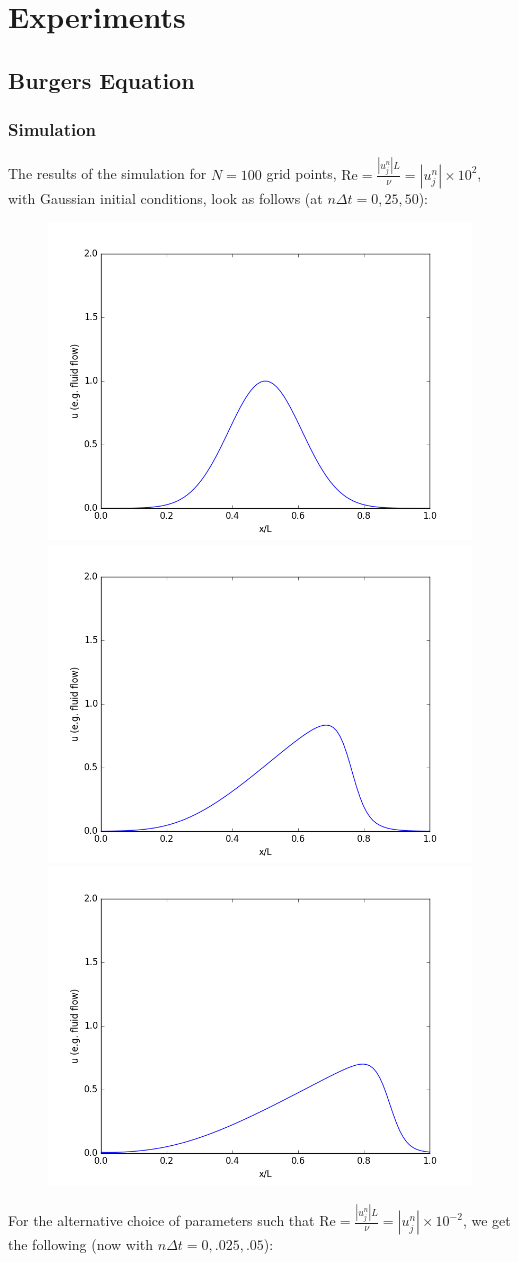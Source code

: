 \documentclass[12pt]{article}
\begin{document}
\section{Experiments}

\subsection{Burgers Equation}

\subsubsection{Simulation}

The results of the simulation for $N = 100$ grid points, $\text{Re} = \frac{|u_j^n|L}{\nu} = |u_j^n| \times 10^2$, with Gaussian initial conditions, look as follows (at $n\Delta t = 0, 25, 50$):
\begin{figure}[H]
\includegraphics[width=.32\hsize]{burgers0.png} \includegraphics[width=.32\hsize]{burgers250.png} \includegraphics[width=.32\hsize]{burgers500.png}
\end{figure}
\noindent For the alternative choice of parameters such that $\text{Re} = \frac{|u_j^n|L}{\nu} =  |u_j^n|\times 10^{-2}$, we get the following (now with $n\Delta t = 0, .025, .05$):
\end{document}

